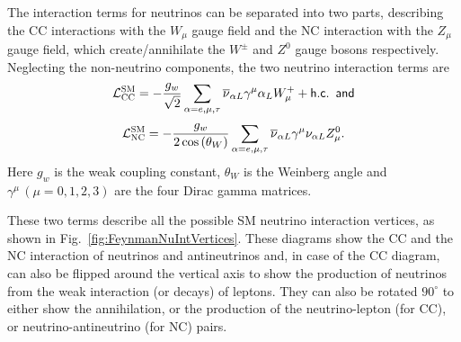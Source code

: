 

The interaction terms for neutrinos can be separated into two parts, describing the \gls{CC} interactions with the $W_\mu$ gauge field and the \gls{NC} interaction with the $Z_\mu$ gauge field, which create/annihilate the $W^\pm$ and $Z^0$ gauge bosons respectively. Neglecting the non-neutrino components, the two neutrino interaction terms are \cite{FundamentalsOfNeutrinoPhysics.pdf}
\begin{equation}\label{eq:NuIntCCLagrangian}
\mathcal{L}_{\textsc{CC}}^{\textsc{SM}}=
-\frac{g_w}{\sqrt{2}}\sum_{\alpha=e,\mu,\tau}\overline{\nu}_{\alpha L}\gamma^\mu\alpha_L W_\mu^+ +\textsf{h.c.}\,\,\,\textsf{and}
\end{equation}
\begin{equation}\label{eq:NuIntNCLagrangian}
\mathcal{L}_{\textsc{NC}}^{\textsc{SM}}=
-\frac{g_w}{2\cos\left(\theta_W\right)}\sum_{\alpha=e,\mu,\tau} \overline{\nu}_{\alpha L} \gamma^\mu \nu_{\alpha L} Z_\mu^0.
\end{equation}
Here $g_w$ is the weak coupling constant, $\theta_W$ is the Weinberg angle and $\gamma^\mu\,\left(\mu=0,1,2,3\right)$ are the four Dirac gamma matrices.

These two terms describe all the possible \gls{SM} neutrino interaction vertices, as shown in Fig.~\ref{fig:FeynmanNuIntVertices}. These diagrams show the \gls{CC} and the \gls{NC} interaction of neutrinos and antineutrinos and, in case of the \gls{CC} diagram, can also be flipped around the vertical axis to show the production of neutrinos from the weak interaction (or decays) of leptons. They can also be rotated $90^{\circ}$ to either show the annihilation, or the production of the neutrino-lepton (for \gls{CC}), or neutrino-antineutrino (for \gls{NC}) pairs.

